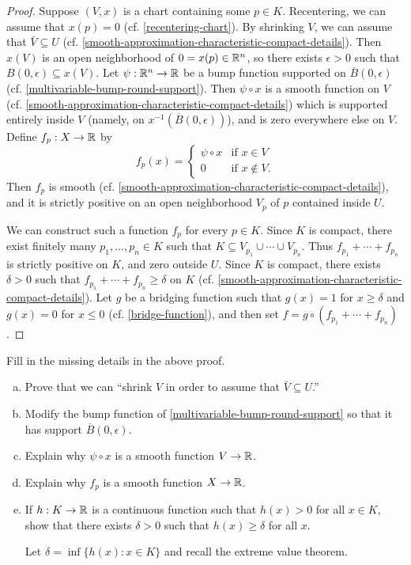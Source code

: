 \begin{proof}
	Suppose $(V, x)$ is a chart containing some $p \in K$. Recentering, we can assume that $x(p) = 0$ (cf. \cref{recentering-chart}). By shrinking $V$, we can assume that $\bar{V} \subseteq U$ (cf. \cref{smooth-approximation-characteristic-compact-details}). Then $x(V)$ is an open neighborhood of $0 = x(p) \in \mathbb{R}^n$, so there exists $\epsilon > 0$ such that $B(0, \epsilon) \subseteq x(V)$. Let $\psi : \mathbb{R}^n \to \mathbb{R}$ be a bump function supported on $\overline{B}(0, \epsilon)$ (cf. \cref{multivariable-bump-round-support}). Then $\psi \circ x$ is a smooth function on $V$ (cf. \cref{smooth-approximation-characteristic-compact-details}) which is supported entirely inside $V$ (namely, on $x^{-1}(\overline{B}(0,\epsilon))$), and is zero everywhere else on $V$. Define $f_p : X \to \mathbb{R}$ by
	\[ f_p(x) = \begin{cases} \psi \circ x & \text{if } x \in V \\ 0 &  \text{if } x \notin V. \end{cases} \]
	Then $f_p$ is smooth (cf. \cref{smooth-approximation-characteristic-compact-details}), and it is strictly positive on an open neighborhood $V_p$ of $p$ contained inside $U$.  
	
	We can construct such a function $f_p$ for every $p \in K$. Since $K$ is compact, there exist finitely many $p_1, \dotsc, p_n \in K$ such that $K \subseteq V_{p_1} \cup \dotsb \cup V_{p_n}$. Thus $f_{p_1} + \dotsb + f_{p_n}$ is strictly positive on $K$, and zero outside $U$. Since $K$ is compact, there exists $\delta > 0$ such that $f_{p_1} + \dotsb + f_{p_n} \geq \delta$ on $K$ (cf. \cref{smooth-approximation-characteristic-compact-details}). Let $g$ be a bridging function such that $g(x) = 1$ for $x \geq \delta$ and $g(x) = 0$ for $x \leq 0$ (cf. \cref{bridge-function}), and then set $f = g \circ (f_{p_1} + \dotsb + f_{p_n})$.
\end{proof}

\begin{exercise} \label{smooth-approximation-characteristic-compact-details}
	Fill in the missing details in the above proof. 
	\begin{enumerate}[(a)]
		\item Prove that we can ``shrink $V$ in order to assume that $\bar{V} \subseteq U$.''
		\item Modify the bump function of \cref{multivariable-bump-round-support} so that it has support $\overline{B}(0, \epsilon)$. 
		\item Explain why $\psi \circ x$ is a smooth function $V \to \mathbb{R}$. 
		\item Explain why $f_p$ is a smooth function $X \to \mathbb{R}$. 
		\item If $h : K \to \mathbb{R}$ is a continuous function such that $h(x) > 0$ for all $x \in K$, show that there exists $\delta > 0$ such that $h(x) \geq \delta$ for all $x$. 
		
		\begin{hint}
			Let $\delta = \inf\{ h(x) : x \in K \}$ and recall the extreme value theorem. 
		\end{hint}
	\end{enumerate}
\end{exercise}

